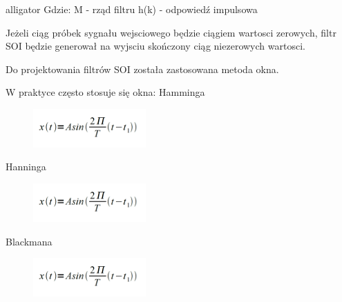 \documentclass[12pt]{article}
\begin{document}
\begin{labeling}{alligator}
Gdzie:
\subitem M - rząd filtru
\subitem h(k) - odpowiedź impulsowa

Jeżeli ciąg próbek sygnału wejsciowego będzie ciągiem wartosci zerowych,  filtr SOI będzie generował na wyjsciu skończony ciąg niezerowych wartosci.

Do projektowania filtrów SOI została zastosowana metoda okna.


W praktyce często stosuje się okna:
\subitem Hamminga

\begin{figure}[h!]
 \centering
 \includegraphics[width=4.3cm]{SinWzor.PNG}
 \vspace{-0.3cm}
 \label{gw}
\end{figure}

\subitem Hanninga

\begin{figure}[h!]
 \centering
 \includegraphics[width=4.3cm]{SinWzor.PNG}
 \vspace{-0.3cm}
 \label{gw}
\end{figure}

\subitem Blackmana

\begin{figure}[h!]
 \centering
 \includegraphics[width=4.3cm]{SinWzor.PNG}
 \vspace{-0.3cm}
 \label{gw}
\end{figure}



\end{labeling}
\end{document}
